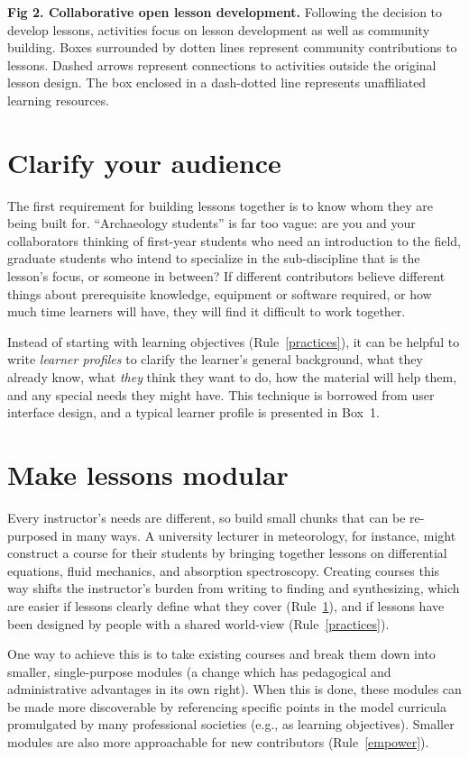 \documentclass[10pt,letterpaper]{article}
\newcommand{\rulemajor}[2]{\section{#1}\label{#2}}
\newcommand{\ruleref}[1]{Rule~\ref{#1}}
\begin{document}
\begin{mdframed}
\noindent
\textbf{Fig 2. Collaborative open lesson development.} Following the decision to develop 
lessons, activities focus on lesson development as well as community building. 
Boxes surrounded by dotten lines represent community contributions to lessons.
Dashed arrows represent connections to activities outside the original lesson design.
The box enclosed in a dash-dotted line represents unaffiliated learning resources.
\end{mdframed}

\rulemajor{Clarify your audience}{audience}

The first requirement for building lessons together is
to know whom they are being built for.
``Archaeology students'' is far too vague:
are you and your collaborators thinking of
first-year students who need an introduction to the field,
graduate students who intend to specialize in the sub-discipline that is the lesson's focus,
or someone in between?
If different contributors believe different things about prerequisite knowledge,
equipment or software required,
or how much time learners will have,
they will find it difficult to work together.

Instead of starting with learning objectives (\ruleref{practices}),
it can be helpful to write \emph{learner profiles} to clarify
the learner's general background,
what they already know,
what \emph{they} think they want to do,
how the material will help them,
and any special needs they might have.
This technique is borrowed from user interface design,
and a typical learner profile is presented in Box~1.

\rulemajor{Make lessons modular}{modular}

Every instructor's needs are different,
so build small chunks that can be re-purposed in many ways.
A university lecturer in meteorology,
for instance,
might construct a course for their students by bringing together lessons on differential equations,
fluid mechanics,
and absorption spectroscopy.
Creating courses this way shifts the instructor's burden from writing to finding and synthesizing,
which are easier if lessons clearly define what they cover (\ruleref{audience}),
and if lessons have been designed by people with a shared world-view (\ruleref{practices}).

One way to achieve this is to take existing courses and break them down into smaller, single-purpose modules
(a change which has pedagogical and administrative advantages in its own right).
When this is done,
these modules can be made more discoverable
by referencing specific points in the model curricula promulgated by many professional societies
(e.g., as learning objectives).
Smaller modules are also more approachable for new contributors (\ruleref{empower}).
\end{document}
